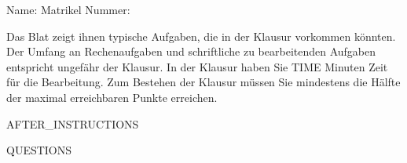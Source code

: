 \documentclass[addpoints]{exam}
\begin{document}
\vspace{0.2in}
Name:\enspace\hrulefill
\hspace{0.2in}
Matrikel Nummer:\enspace\hrulefill

\vspace{0.2in}

\begin{center}
    \centering
    Das Blat zeigt ihnen typische Aufgaben, die in der Klausur vorkommen könnten. Der Umfang an
    Rechenaufgaben und schriftliche zu bearbeitenden Aufgaben entspricht ungefähr der Klausur.
    In der Klausur haben Sie {{TIME}} Minuten Zeit für die Bearbeitung.
    Zum Bestehen der Klausur müssen Sie mindestens die Hälfte der maximal erreichbaren Punkte erreichen.
\end{center}

\vspace{0.2in}

{{AFTER_INSTRUCTIONS}}

{{QUESTIONS}}
\end{document}
